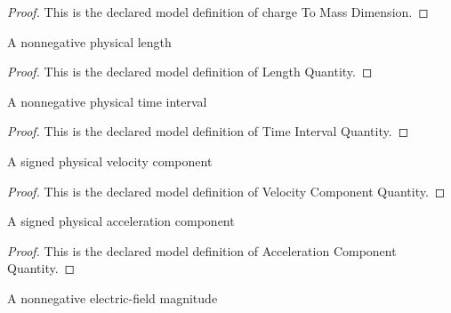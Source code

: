\begin{proof}
  This is the declared model definition of charge To Mass Dimension.
\end{proof}
\begin{definition}
  \label{def:physics:phyx-mini-0561:phyxminiproblems-problemphyxmini0561-lengthquantity}
  A nonnegative physical length
\end{definition}
\begin{proof}
  This is the declared model definition of Length Quantity.
\end{proof}
\begin{definition}
  \label{def:physics:phyx-mini-0561:phyxminiproblems-problemphyxmini0561-timeintervalquantity}
  A nonnegative physical time interval
\end{definition}
\begin{proof}
  This is the declared model definition of Time Interval Quantity.
\end{proof}
\begin{definition}
  \label{def:physics:phyx-mini-0561:phyxminiproblems-problemphyxmini0561-velocitycomponentquantity}
  A signed physical velocity component
\end{definition}
\begin{proof}
  This is the declared model definition of Velocity Component Quantity.
\end{proof}
\begin{definition}
  \label{def:physics:phyx-mini-0561:phyxminiproblems-problemphyxmini0561-accelerationcomponentquantity}
  A signed physical acceleration component
\end{definition}
\begin{proof}
  This is the declared model definition of Acceleration Component Quantity.
\end{proof}
\begin{definition}
  \label{def:physics:phyx-mini-0561:phyxminiproblems-problemphyxmini0561-electricfieldstrengthquantity}
  A nonnegative electric-field magnitude
\end{definition}
